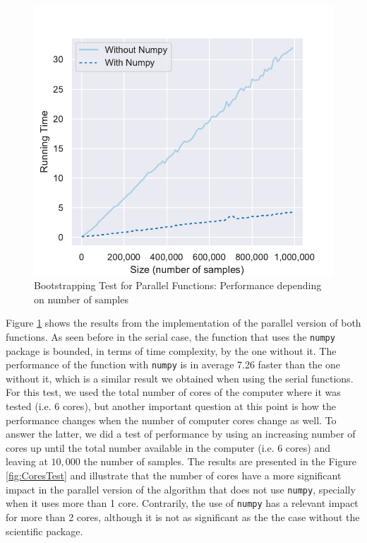 \documentclass[11pt]{article}
\begin{document}
\begin{figure}[H]
    \begin{center}
        \includegraphics{parallel_test.pdf}
    \end{center}
    \caption{Bootstrapping Test for Parallel Functions: Performance depending on number of samples}\label{fig:ParallelTest}
\end{figure}

Figure \ref{fig:ParallelTest} shows the results from the implementation of the parallel version of both functions. As seen before
in the serial case, the function that uses the \texttt{numpy} package is bounded, in terms of time complexity, by the one
without it. The performance of the function with \texttt{numpy} is in average 7.26 faster than the one without it, which
is a similar result we obtained when using the serial functions. For this test, we used the total number of cores of the
computer where it was tested (i.e. 6 cores), but another important question at this point is how the performance changes
when the number of computer cores change as well. To answer the latter, we did a test of performance by using an increasing
number of cores up until the total number available in the computer (i.e. 6 cores) and leaving at $10,000$ the number of samples.
The results are presented in the Figure \ref{fig:CoresTest} and illustrate that the number of cores have a more significant
impact in the parallel version of the algorithm that does not use \texttt{numpy}, specially when it uses more than 1 core.
Contrarily, the use of \texttt{numpy} has a relevant impact for more than 2 cores, although it is not as significant
as the the case without the scientific package.
\end{document}
